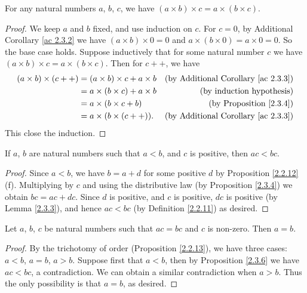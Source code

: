 \begin{proposition}\label{2.3.5}
For any natural numbers \(a\), \(b\), \(c\), we have \((a \times b) \times c = a \times (b \times c)\).
\end{proposition}

\begin{proof}
We keep \(a\) and \(b\) fixed, and use induction on \(c\).
For \(c = 0\), by Additional Corollary \ref{ac 2.3.2} we have \((a \times b) \times 0 = 0\) and \(a \times (b \times 0) = a \times 0 = 0\).
So the base case holds.
Suppose inductively that for some natural number \(c\) we have \((a \times b) \times c = a \times (b \times c)\).
Then for \(c++\), we have
\begin{align*}
(a \times b) \times (c++) &= (a \times b) \times c + a \times b & \text{(by Additional Corollary \ref{ac 2.3.3})} \\
&= a \times (b \times c) + a \times b & \text{(by induction hypothesis)} \\
&= a \times (b \times c + b) & \text{(by Proposition \ref{2.3.4})} \\
&= a \times (b \times (c++)). & \text{(by Additional Corollary \ref{ac 2.3.3})}
\end{align*}
This close the induction.
\end{proof}

\begin{proposition}\label{2.3.6}
If \(a\), \(b\) are natural numbers such that \(a < b\), and \(c\) is positive, then \(ac < bc\).
\end{proposition}

\begin{proof}
Since \(a < b\), we have \(b = a + d\) for some positive \(d\) by Proposition \ref{2.2.12}(f).
Multiplying by \(c\) and using the distributive law (by Proposition \ref{2.3.4}) we obtain \(bc = ac + dc\).
Since \(d\) is positive, and \(c\) is positive, \(dc\) is positive (by Lemma \ref{2.3.3}), and hence \(ac < bc\) (by Definition \ref{2.2.11}) as desired.
\end{proof}

\begin{corollary}\label{2.3.7}
Let \(a\), \(b\), \(c\) be natural numbers such that \(ac = bc\) and \(c\) is non-zero.
Then \(a = b\).
\end{corollary}

\begin{proof}
By the trichotomy of order (Proposition \ref{2.2.13}), we have three cases: \(a < b\), \(a = b\), \(a > b\).
Suppose first that \(a < b\), then by Proposition \ref{2.3.6} we have \(ac < bc\), a contradiction.
We can obtain a similar contradiction when \(a > b\).
Thus the only possibility is that \(a = b\), as desired.
\end{proof}

